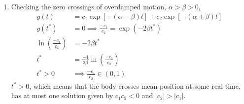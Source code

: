 \begin{enumerate}
    \item Checking the zero crossings of overdamped motion, $ \alpha > \beta > 0 $,
          \begin{align}
              y(t)                                    & = c_{1}\exp\left[ -(\alpha - \beta)t \right] + c_{2}\exp\left[ -(\alpha + \beta)t \right] \\
              y(t^{*})                                & = 0 \implies \frac{-c_{1}}{c_{2}} = \exp(-2\beta t^{*})                                   \\
              \ln \left( \frac{-c_{1}}{c_{2}} \right) & = -2\beta t^{*}                                                                           \\
              t^{*}                                   & =\frac{-1}{2\beta} \ln \left( \frac{-c_{1}}{c_{2}} \right)                                \\
              t^{*} > 0                               & \implies \frac{-c_{1}}{c_{2}} \in (0, 1)
          \end{align}
          $ t^{*} > 0 $, which means that the body crosses mean position at some real time, has at most one solution
          given by $ c_{1}c_{2} < 0 $ and $ |c_{2}| > |c_{1}| $.


\end{enumerate}
